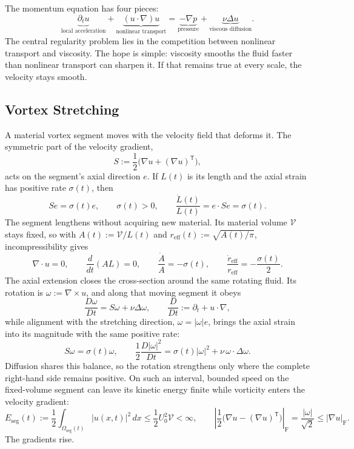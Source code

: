 
The momentum equation has four pieces:
\[
  \underbrace{\partial_t u}_{\text{local acceleration}}
  +
  \underbrace{(u\cdot\nabla)u}_{\text{nonlinear transport}}
  =
  \underbrace{-\nabla p}_{\text{pressure}}
  +
  \underbrace{\nu\Delta u}_{\text{viscous diffusion}}.
\]
The central regularity problem lies in the competition between nonlinear transport and viscosity.
The hope is simple: viscosity smooths the fluid faster than nonlinear transport can sharpen it.
If that remains true at every scale, the velocity stays smooth.

\subsection{Vortex Stretching}\label{sub:ThePerfectlyStretchingVortex}

A material vortex segment moves with the velocity field that deforms it.
The symmetric part of the velocity gradient,
\[
  S:=\frac12\bigl(\nabla u+(\nabla u)^{\mathsf T}\bigr),
\]
acts on the segment's axial direction \(e\).
If \(L(t)\) is its length and the axial strain has positive rate \(\sigma(t)\), then
\[
  Se=\sigma(t)e,
  \qquad
  \sigma(t)>0,
  \qquad
  \frac{\dot L(t)}{L(t)}
  =
  e\cdot Se
  =
  \sigma(t).
\]
The segment lengthens without acquiring new material.
Its material volume \(\mathcal V\) stays fixed, so with \(A(t):=\mathcal V/L(t)\) and \(r_{\mathrm{eff}}(t):=\sqrt{A(t)/\pi}\), incompressibility gives
\[
  \nabla\cdot u=0,
  \qquad
  \frac{d}{dt}(A L)=0,
  \qquad
  \frac{\dot A}{A}=-\sigma(t),
  \qquad
  \frac{\dot r_{\mathrm{eff}}}{r_{\mathrm{eff}}}
  =
  -\frac{\sigma(t)}{2}.
\]
The axial extension closes the cross-section around the same rotating fluid.
Its rotation is \(\omega:=\nabla\times u\), and along that moving segment it obeys
\[
  \frac{D\omega}{Dt}
  =
  S\omega+\nu\Delta\omega,
  \qquad
  \frac{D}{Dt}
  :=
  \partial_t+u\cdot\nabla,
\]
while alignment with the stretching direction, \(\omega=|\omega|e\), brings the axial strain into its magnitude with the same positive rate:
\[
  S\omega
  =
  \sigma(t)\omega,
  \qquad
  \frac12\frac{D|\omega|^2}{Dt}
  =
  \sigma(t)|\omega|^2
  +
  \nu\,\omega\cdot\Delta\omega.
\]
Diffusion shares this balance, so the rotation strengthens only where the complete right-hand side remains positive.
On such an interval, bounded speed on the fixed-volume segment can leave its kinetic energy finite while vorticity enters the velocity gradient:
\[
  E_{\mathrm{seg}}(t)
  :=
  \frac12\int_{\Omega_{\mathrm{seg}}(t)}|u(x,t)|^2\,dx
  \leq
  \frac12U_0^2\mathcal V
  <
  \infty,
  \qquad
  \left|\frac12\bigl(\nabla u-(\nabla u)^{\mathsf T}\bigr)\right|_{\mathrm F}
  =
  \frac{|\omega|}{\sqrt2}
  \leq
  |\nabla u|_{\mathrm F}.
\]
The gradients rise.

